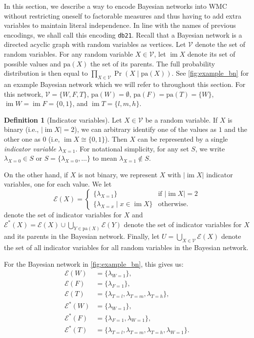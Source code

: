 \documentclass{article}
\theoremstyle{definition}
\newtheorem{definition}{Definition}
\theoremstyle{remark}
\DeclareMathOperator{\im}{im}
\begin{document}
{In this section, we describe a way to encode Bayesian networks into WMC without
restricting oneself to factorable measures and thus having to add extra
variables to maintain literal independence. In line with the names of previous
encodings, we shall call this encoding \texttt{db21}. Recall that a Bayesian
network is a directed acyclic graph with random variables as vertices. Let
$\mathcal{V}$ denote the set of random variables. For any random variable $X \in
\mathcal{V}$, let $\im X$ denote its set of possible values and $\mathrm{pa}(X)$
the set of its parents. The full probability distribution is then equal to
$\prod_{X \in \mathcal{V}} \Pr(X \mid \mathrm{pa}(X))$. See
\cref{fig:example_bn} for an example Bayesian network which we will refer to
throughout this section. For this network, $\mathcal{V} = \{ W, F, T \}$,
$\mathrm{pa}(W) = \emptyset$, $\mathrm{pa}(F) = \mathrm{pa}(T) = \{ W \}$, $\im
W = \im F = \{0, 1 \}$, and $\im T = \{ l, m, h \}$.

\begin{definition}[Indicator variables]
  Let $X \in \mathcal{V}$ be a random variable. If $X$ is binary (i.e., $|\im X|
  = 2$), we can arbitrary identify one of the values as $1$ and the other one as
  $0$ (i.e, $\im X \cong \{ 0, 1 \}$). Then $X$ can be represented by a single
  \emph{indicator variable} $\lambda_{X=1}$. For notational simplicity, for any
  set $S$, we write $\lambda_{X=0} \in S$ or $S = \{ \lambda_{X=0}, \dots \}$ to
  mean $\lambda_{X=1} \not\in S$.

  On the other hand, if $X$ is not binary, we represent $X$ with $|\im X|$
  indicator variables, one for each value. We let
  \[
    \mathcal{E}(X) = \begin{cases}
      \{ \lambda_{X=1} \} & \text{if } |\im X| = 2 \\
      \{ \lambda_{X=x} \mid x \in \im X \} & \text{otherwise.}
    \end{cases}
  \]
  denote the set of indicator variables for $X$ and $\mathcal{E}^*(X) =
  \mathcal{E}(X) \cup \bigcup_{Y \in \mathrm{pa}(X)} \mathcal{E}(Y)$ denote the
  set of indicator variables for $X$ and its parents in the Bayesian network.
  Finally, let $U = \bigcup_{X \in \mathcal{V}} \mathcal{E}(X)$ denote the set
  of all indicator variables for all random variables in the Bayesian network.
\end{definition}

For the Bayesian network in \cref{fig:example_bn}, this gives us:
\begin{align*}
  \mathcal{E}(W) &= \{ \lambda_{W=1} \}, \\
  \mathcal{E}(F) &= \{ \lambda_{F=1} \}, \\
  \mathcal{E}(T) &= \{ \lambda_{T=l}, \lambda_{T=m}, \lambda_{T=h} \}, \\
  \mathcal{E}^*(W) &= \{ \lambda_{W=1} \}, \\
  \mathcal{E}^*(F) &= \{ \lambda_{F=1}, \lambda_{W=1} \}, \\
  \mathcal{E}^*(T) &= \{ \lambda_{T=l}, \lambda_{T=m}, \lambda_{T=h}, \lambda_{W=1} \}.
\end{align*}

}
\end{document}
